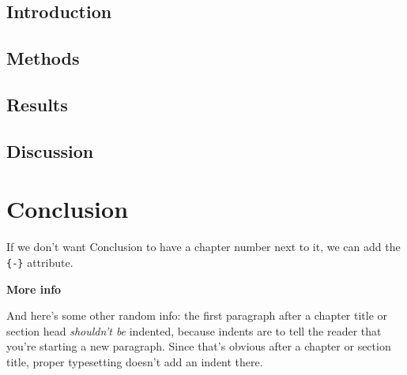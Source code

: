 \documentclass[twoside,12pt,final]{ucthesis-CA2012}
\begin{document}
\begin{ucmainmatter}
{\section{Introduction}\label{introduction}}

\hypertarget{methods}{%
\section{Methods}\label{methods}}

\hypertarget{results}{%
\section{Results}\label{results}}

\hypertarget{discussion}{%
\section{Discussion}\label{discussion}}

\hypertarget{conclusion}{%
\chapter*{Conclusion}\label{conclusion}}

If we don't want Conclusion to have a chapter number next to it, we can add the \texttt{\{-\}} attribute.

\textbf{More info}

And here's some other random info: the first paragraph after a chapter title or section head \emph{shouldn't be} indented, because indents are to tell the reader that you're starting a new paragraph. Since that's obvious after a chapter or section title, proper typesetting doesn't add an indent there.

\appendix

\hypertarget{appendix-1}{%
}
\end{ucmainmatter}
\end{document}
